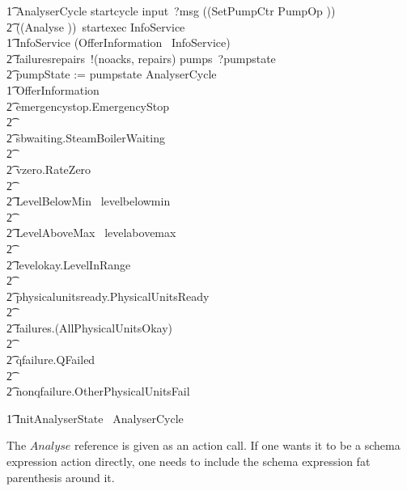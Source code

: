 \documentclass{report}
\newcommand{\lschexpract}{\left(\!\!\left(}
\newcommand{\rschexpract}{\right)\!\!\right)}
\newcommand{\lcircguard}{\left\langle}
\newcommand{\rcircguard}{\right\rangle}
\begin{document}
\begin{circusaction}
    \t1 AnalyserCycle \circdef startcycle \then input~?msg \then \lschexpract SetPumpCtr \land PumpOp \rschexpract \circseq \\
            \t2 \lschexpract Analyse \rschexpract \circseq\ startexec \then InfoService \\
    \t1 InfoService \circdef (OfferInformation \circseq\ InfoService) \extchoice \\
            \t2 failuresrepairs~!(noacks, repairs) \then pumps~?pumpstate \then \\
            \t2 pumpState := pumpstate \circseq AnalyserCycle \\
    \t1 OfferInformation \circdef \\
            \t2 emergencystop.EmergencyStop \then \Skip \\ \t2 \extchoice \\ %
            \t2 sbwaiting.SteamBoilerWaiting \then \Skip \\ \t2 \extchoice \\
            \t2 vzero.RateZero \then \Skip \\ \t2 \extchoice \\ %
            \t2 \lcircguard LevelBelowMin \rcircguard \circguard\ levelbelowmin \then \Skip \\ \t2 \extchoice \\
            \t2 \lcircguard LevelAboveMax \rcircguard \circguard\ levelabovemax \then \Skip \\ \t2 \extchoice \\ %
            \t2 levelokay.LevelInRange \then \Skip \\ \t2 \extchoice \\ %
            \t2 physicalunitsready.PhysicalUnitsReady \then \Skip \\ \t2 \extchoice  \\ %
            \t2 failures.(\lnot AllPhysicalUnitsOkay) \then \Skip \\ \t2 \extchoice \\
            \t2 qfailure.QFailed \then \Skip \\ \t2 \extchoice \\ %
            \t2 nonqfailure.OtherPhysicalUnitsFail \then \Skip \\
\end{circusaction}

\begin{circusaction}
    \t1 \circspot InitAnalyserState \circseq\ AnalyserCycle
\end{circusaction}
The $Analyse$ reference is given as an action call. If one wants it to be a schema expression action
directly, one needs to include the schema expression fat parenthesis around it.
\end{document}
